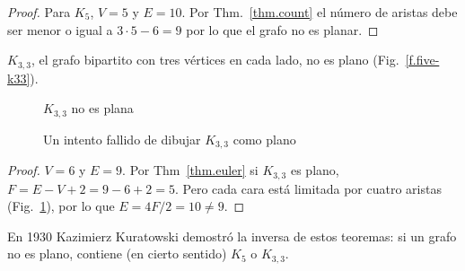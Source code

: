 {{\begin{proof}
Para $K_5$, $V=5$ y $E=10$. Por Thm.~\ref{thm.count} el número de aristas debe ser menor o igual a $3\cdot 5 -6=9$ por lo que el grafo no es planar.
\end{proof}

\begin{theorem}
$K_{3,3}$, el grafo bipartito con tres vértices en cada lado, no es plano (Fig.~\ref{f.five-k33}).
\end{theorem}

\begin{figure}[b]
\begin{minipage}{.45\textwidth}
\begin{center}
\caption{$K_{3,3}$ no es plana}\label{f.five-k33}
\end{center}
\end{minipage}
\hfill
\begin{minipage}{.45\textwidth}
\begin{center}
\caption{Un intento fallido de dibujar $K_{3,3}$ como plano}\label{f.five-k33-failed}
\end{center}
\end{minipage}
\end{figure}

\begin{proof}
$V=6$ y $E=9$. Por Thm~\ref{thm.euler} si $K_{3,3}$ es plano, $F=E-V+2=9-6+2=5$. Pero cada cara está limitada por cuatro aristas (Fig.~\ref{f.five-k33-failed}), por lo que $E=4F/2=10\neq 9$.
\end{proof}

En 1930 Kazimierz Kuratowski demostró la inversa de estos teoremas: si un grafo no es plano, contiene (en cierto sentido) $K_5$ o $K_{3,3}$.

}}
